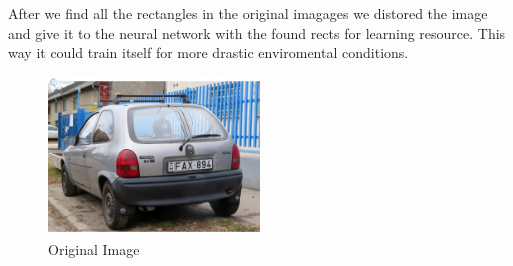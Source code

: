 After we find all the rectangles in the original imagages we distored the image and give it to the neural network with the found rects
for learning resource. This way it could train itself for more drastic enviromental conditions.
\begin{figure}[!htb]
    \centering
    \includegraphics[width=0.5\textwidth]{figures/original.jpg}
    \caption{Original Image}
    \label{fig:wheater-original}
\end{figure}
